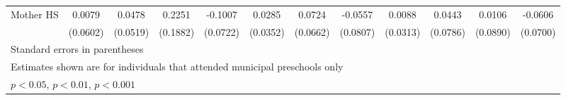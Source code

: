 \documentclass{article}
\begin{document}
\begin{table}[htbp]
\begin{tabular}{l*{11}{c}}
\addlinespace
Mother HS   &      0.0079         &      0.0478         &      0.2251         &     -0.1007         &      0.0285         &      0.0724         &     -0.0557         &      0.0088         &      0.0443         &      0.0106         &     -0.0606         \\
            &    (0.0602)         &    (0.0519)         &    (0.1882)         &    (0.0722)         &    (0.0352)         &    (0.0662)         &    (0.0807)         &    (0.0313)         &    (0.0786)         &    (0.0890)         &    (0.0700)         \\
\bottomrule
\multicolumn{12}{l}{\footnotesize Standard errors in parentheses}\\
\multicolumn{12}{l}{\footnotesize Estimates shown are for individuals that attended municipal preschools only}\\
\multicolumn{12}{l}{\footnotesize \sym{*} \(p<0.05\), \sym{**} \(p<0.01\), \sym{***} \(p<0.001\)}\\
\end{tabular}
\end{table}
\end{document}
